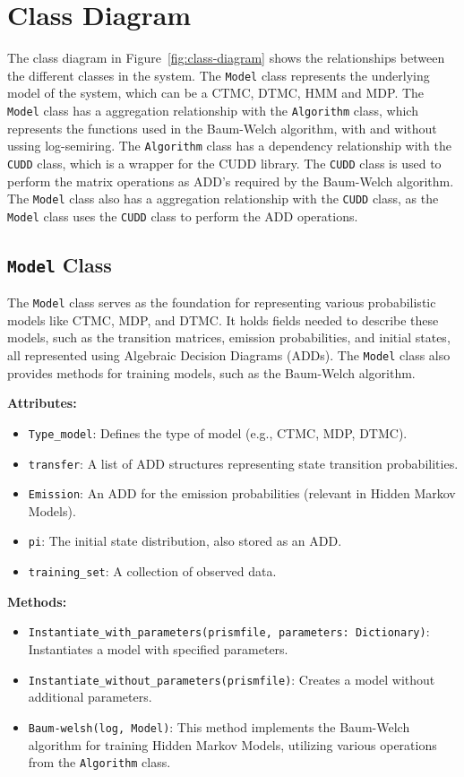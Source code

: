 \section{Class Diagram}\label{sec:class-diagram}
The class diagram in Figure~\ref{fig:class-diagram} shows the relationships between the different classes in the system.
The \texttt{Model} class represents the underlying model of the system, which can be a CTMC, DTMC, HMM and MDP.
The \texttt{Model} class has a aggregation relationship with the \texttt{Algorithm} class, which represents the functions used in the Baum-Welch algorithm, with and without ussing log-semiring.
The \texttt{Algorithm} class has a dependency relationship with the \texttt{CUDD} class, which is a wrapper for the CUDD library.
The \texttt{CUDD} class is used to perform the matrix operations as ADD's required by the Baum-Welch algorithm.
The \texttt{Model} class also has a aggregation relationship with the \texttt{CUDD} class, as the \texttt{Model} class uses the \texttt{CUDD} class to perform the ADD operations.

\subsection{\texttt{Model} Class}
The \texttt{Model} class serves as the foundation for representing various probabilistic models like CTMC, MDP, and DTMC. 
It holds fields needed to describe these models, such as the transition matrices, emission probabilities, and initial states, all represented using Algebraic Decision Diagrams (ADDs). 
The \texttt{Model} class also provides methods for training models, such as the Baum-Welch algorithm.

\textbf{Attributes:}
\begin{itemize}
    \item \texttt{Type\_model}: Defines the type of model (e.g., CTMC, MDP, DTMC).
    \item \texttt{transfer}: A list of ADD structures representing state transition probabilities.
    \item \texttt{Emission}: An ADD for the emission probabilities (relevant in Hidden Markov Models).
    \item \texttt{pi}: The initial state distribution, also stored as an ADD.
    \item \texttt{training\_set}: A collection of observed data.
\end{itemize}
\textbf{Methods:}
\begin{itemize}
    \item \texttt{Instantiate\_with\_parameters(prismfile, parameters: Dictionary)}: Instantiates a model with specified parameters.
    \item \texttt{Instantiate\_without\_parameters(prismfile)}: Creates a model without additional parameters.
    \item \texttt{Baum-welsh(log, Model)}: This method implements the Baum-Welch algorithm for training Hidden Markov Models, utilizing various operations from the \texttt{Algorithm} class.
\end{itemize}


